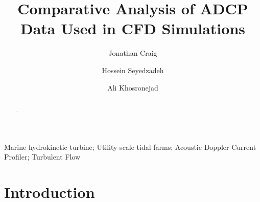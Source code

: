 \documentclass[12pt,sort&compress]{elsarticle}
\theoremstyle{definition}%
\renewenvironment{highlights}
  {\section*{Highlights}\begin{itemize}[leftmargin=*,noitemsep,topsep=0pt]}
  {\end{itemize}}
\begin{document}
\begin{frontmatter}



\title{Comparative Analysis of ADCP Data Used in CFD Simulations}

\author[sbu]{Jonathan Craig}
\author[sbu]{Hossein Seyedzadeh}
\author[sbu]{Ali Khosronejad}
\ead{}
\address[sbu]{Department of Civil Engineering, Stony Brook University, Stony Brook, NY 11794, USA}

\begin{abstract}

\noindent .
\end{abstract}

\begin{keyword}
{Marine hydrokinetic turbine; Utility-scale tidal farms; Acoustic Doppler Current Profiler; Turbulent Flow}
\end{keyword}

\end{frontmatter}
\clearpage   %

\section{Introduction}
\label{sec:intro}
\end{document}
